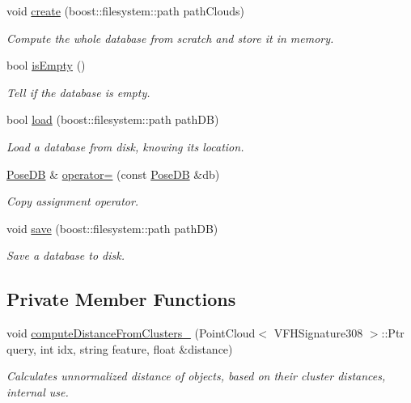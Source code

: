 \begin{DoxyCompactItemize}
void \hyperlink{classPoseDB_a2e1c0fcc4e7144076a5000bb0a41e2c1}{create} (boost\-::filesystem\-::path path\-Clouds)
\begin{DoxyCompactList}\small\item\em Compute the whole database from scratch and store it in memory. \end{DoxyCompactList}\item 
bool \hyperlink{classPoseDB_a2d4a07831798cb574a1b5073a1fd263e}{is\-Empty} ()
\begin{DoxyCompactList}\small\item\em Tell if the database is empty. \end{DoxyCompactList}\item 
bool \hyperlink{classPoseDB_aa4209b95406472e4eea23cd9bc12eb66}{load} (boost\-::filesystem\-::path path\-D\-B)
\begin{DoxyCompactList}\small\item\em Load a database from disk, knowing its location. \end{DoxyCompactList}\item 
\hyperlink{classPoseDB}{Pose\-D\-B} \& \hyperlink{classPoseDB_a507a78a3550cc572ef9cb1ca0cf76366}{operator=} (const \hyperlink{classPoseDB}{Pose\-D\-B} \&db)
\begin{DoxyCompactList}\small\item\em Copy assignment operator. \end{DoxyCompactList}\item 
void \hyperlink{classPoseDB_a3bc7a3f5efdbf367bf1be91ec4272f60}{save} (boost\-::filesystem\-::path path\-D\-B)
\begin{DoxyCompactList}\small\item\em Save a database to disk. \end{DoxyCompactList}\end{DoxyCompactItemize}
\subsection*{Private Member Functions}
\begin{DoxyCompactItemize}
\item 
void \hyperlink{classPoseDB_af5aa1a4a00a7bc8e33881ef57e52b64f}{compute\-Distance\-From\-Clusters\-\_\-} (Point\-Cloud$<$ V\-F\-H\-Signature308 $>$\-::Ptr query, int idx, string feature, float \&distance)
\begin{DoxyCompactList}\small\item\em Calculates unnormalized distance of objects, based on their cluster distances, internal use. \end{DoxyCompactList}\end{DoxyCompactItemize}
